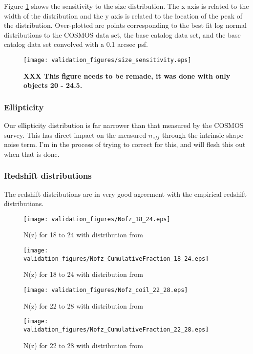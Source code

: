 \documentclass[]{article}
\begin{document}
Figure \ref{fig:size_sens} shows the sensitivity to the size distribution.  The x axis is related to the width of the 
distribution and the y axis is related to the location of the peak of the distribution. Over-plotted are points corresponding
to the best fit log normal distributions to the COSMOS data set, the base catalog data set, and the base catalog data set convolved 
with a 0.1 arcsec psf.
\begin{figure}
\centering
\texttt{[image: validation\_figures/size\_sensitivity.eps]}
\caption{{\bf XXX This figure needs to be remade, it was done with only objects 20 - 24.5.}\label{fig:size_sens}}
\end{figure}

\subsubsection{Ellipticity}
Our ellipticity distribution is far narrower than that measured by the COSMOS survey.  This has direct impact on the measured
$n_{eff}$ through the intrinsic shape noise term.  I'm in the process of trying to correct for this, and will flesh this out when that is done.


\subsubsection{Redshift distributions}
The redshift distributions are in very good agreement with the \cite{coil} empirical redshift distributions.
\begin{figure}
\centering
\texttt{[image: validation\_figures/Nofz\_18\_24.eps]}
\caption{N(z) for 18 to 24 with distribution from \cite{coil}\label{fig:nofz18_24}}
\end{figure}
\begin{figure}
\centering
\texttt{[image: validation\_figures/Nofz\_CumulativeFraction\_18\_24.eps]}
\caption{N(z) for 18 to 24 with distribution from \cite{coil}\label{fig:nofz18_24_ratio}}
\end{figure}
\begin{figure}
\centering
\texttt{[image: validation\_figures/Nofz\_coil\_22\_28.eps]}
\caption{N(z) for 22 to 28 with distribution from \cite{coil}\label{fig:nofz22_28}}
\end{figure}
\begin{figure}
\centering
\texttt{[image: validation\_figures/Nofz\_CumulativeFraction\_22\_28.eps]}
\caption{N(z) for 22 to 28 with distribution from \cite{coil}\label{fig:nofz22_28_ratio}}
\end{figure}
\end{document}
